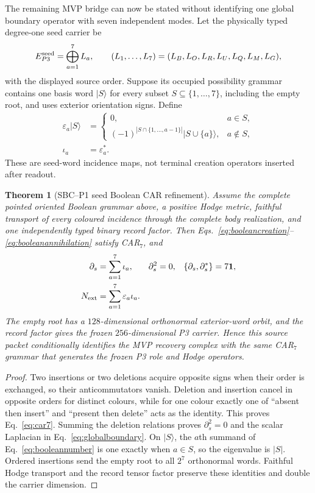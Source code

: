 \documentclass[11pt,a4paper]{article}
\newtheorem{theorem}[definition]{Theorem}
\theoremstyle{remark}
\newcommand{\id}{\mathbf 1}
\begin{document}
The remaining MVP bridge can now be stated without identifying one global
boundary operator with seven independent modes.  Let the physically typed
degree-one seed carrier be
\begin{equation}
 E_{P3}^{\rm seed}=\bigoplus_{a=1}^{7}L_a,
 \qquad
 (L_1,\ldots,L_7)=(L_B,L_O,L_R,L_U,L_Q,L_M,L_G),
 \label{eq:typedseedframe}
\end{equation}
with the displayed source order.  Suppose its occupied possibility grammar
contains one basis word $|S\rangle$ for every subset
$S\subseteq\{1,\ldots,7\}$, including the empty root, and uses exterior
orientation signs.  Define
\begin{align}
 \varepsilon_a|S\rangle
 &=\begin{cases}
 0,&a\in S,\\
 (-1)^{|S\cap\{1,\ldots,a-1\}|}|S\cup\{a\}\rangle,&a\notin S,
 \end{cases}\label{eq:booleancreation}\\
 \iota_a&=\varepsilon_a^*.
 \label{eq:booleanannihilation}
\end{align}
These are seed-word incidence maps, not terminal creation operators inserted
after readout.

\begin{theorem}[SBC--P1 seed Boolean CAR refinement]
Assume the complete pointed oriented Boolean grammar above, a positive Hodge
metric, faithful transport of every coloured incidence through the complete
body realization, and one independently typed binary record factor.  Then
Eqs.~\eqref{eq:booleancreation}--\eqref{eq:booleanannihilation} satisfy
CAR$_7$, and
\begin{align}
 \partial_s&=\sum_{a=1}^{7}\iota_a,
 &\partial_s^2&=0,
 &\{\partial_s,\partial_s^*\}&=7\id,\label{eq:globalboundary}\\
 N_{\rm ext}&=\sum_{a=1}^{7}\varepsilon_a\iota_a.
 \label{eq:booleannumber}
\end{align}
The empty root has a $128$-dimensional orthonormal exterior-word orbit, and
the record factor gives the frozen $256$-dimensional P3 carrier.  Hence this
source packet conditionally identifies the MVP recovery complex with the
same CAR$_7$ grammar that generates the frozen P3 role and Hodge operators.
\label{thm:seedbooleancar}
\end{theorem}

\begin{proof}
Two insertions or two deletions acquire opposite signs when their order is
exchanged, so their anticommutators vanish.  Deletion and insertion cancel in
opposite orders for distinct colours, while for one colour exactly one of
``absent then insert'' and ``present then delete'' acts as the identity.
This proves Eq.~\eqref{eq:car7}.  Summing the deletion relations proves
$\partial_s^2=0$ and the scalar Laplacian in
Eq.~\eqref{eq:globalboundary}.  On $|S\rangle$, the $a$th summand of
Eq.~\eqref{eq:booleannumber} is one exactly when $a\in S$, so the eigenvalue
is $|S|$.  Ordered insertions send the empty root to all $2^7$ orthonormal
words.  Faithful Hodge transport and the record tensor factor preserve these
identities and double the carrier dimension.
\end{proof}
\end{document}
